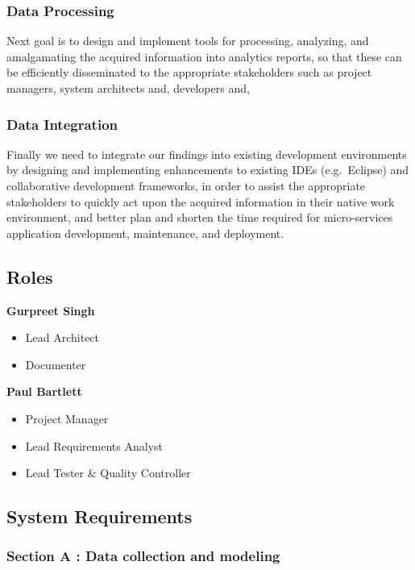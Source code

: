 \documentclass[11pt,]{article}
\begin{document}
\subsubsection{Data Processing}\label{data-processing}

Next goal is to design and implement tools for processing, analyzing,
and amalgamating the acquired information into analytics reports, so
that these can be efficiently disseminated to the appropriate
stakeholders such as project managers, system architects and, developers
and,

\subsubsection{Data Integration}\label{data-integration}

Finally we need to integrate our findings into existing development
environments by designing and implementing enhancements to existing IDEs
(e.g.~Eclipse) and collaborative development frameworks, in order to
assist the appropriate stakeholders to quickly act upon the acquired
information in their native work environment, and better plan and
shorten the time required for micro-services application development,
maintenance, and deployment.

\subsection{Roles}\label{roles}

\textbf{Gurpreet Singh}

\begin{itemize}
\item
  Lead Architect
\item
  Documenter
\end{itemize}

\textbf{Paul Bartlett}

\begin{itemize}
\item
  Project Manager
\item
  Lead Requirements Analyst
\item
  Lead Tester \& Quality Controller
\end{itemize}

\subsection{System Requirements}\label{system-requirements}

\subsubsection{Section A : Data collection and
modeling}\label{section-a-data-collection-and-modeling}
\end{document}

